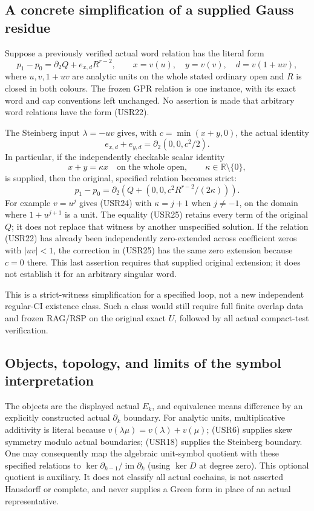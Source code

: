 \subsection{A concrete simplification of a supplied Gauss residue}

Suppose a previously verified actual word relation has the literal
form
\[
 p_1-p_0=\partial_2Q+e_{x,d}R^{r-2},\qquad
 x=v(u),\quad y=v(v),\quad d=v(1+uv),
 \tag{USR22}
\]
where $u,v,1+uv$ are analytic units on the whole stated ordinary
open and $R$ is closed in both colours.  The frozen GPR relation
is one instance, with its exact word and cap conventions left
unchanged.  No assertion is made that arbitrary word relations
have the form (USR22).

The Steinberg input $\lambda=-uv$ gives, with
$c=\min(x+y,0)$, the actual identity
\[
                   e_{x,d}+e_{y,d}
                        =\partial_2(0,0,c^2/2).
 \tag{USR23}
\]
In particular, if the independently checkable scalar identity
\[
                             x+y=\kappa x
                 \quad\text{on the whole open},\qquad
                             \kappa\in\mathbb R\setminus\{0\},
 \tag{USR24}
\]
is supplied, then the original, specified relation becomes strict:
\[
 p_1-p_0=\partial_2\left(
       Q+(0,0,c^2R^{r-2}/(2\kappa))\right).
 \tag{USR25}
\]
For example $v=u^j$ gives (USR24) with $\kappa=j+1$ when
$j\ne-1$, on the domain where $1+u^{j+1}$ is a unit.
The equality (USR25) retains every term of the original $Q$;
it does not replace that witness by another unspecified solution.
If the relation (USR22) has already been independently zero-extended
across coefficient zeros with $|uv|<1$, the correction in (USR25)
has the same zero extension because $c=0$ there.  This last assertion
requires that supplied original extension; it does not establish it
for an arbitrary singular word.

This is a strict-witness simplification for a specified loop, not a
new independent regular-CI existence class.  Such a class would
still require full finite overlap data and frozen RAG/RSP on the
original exact $U$, followed by all actual compact-test verification.

\subsection{Objects, topology, and limits of the symbol interpretation}

The objects are the displayed actual $E_k$, and equivalence means
difference by an explicitly constructed actual $\partial_k$ boundary.
For analytic units, multiplicative additivity is literal because
$v(\lambda\mu)=v(\lambda)+v(\mu)$; (USR6) supplies skew symmetry
modulo actual boundaries; (USR18) supplies the Steinberg boundary.
One may consequently map the algebraic unit-symbol quotient with
these specified relations to
$\ker\partial_{k-1}/\operatorname{im}\partial_k$ (using $\ker D$
at degree zero).  This optional quotient is auxiliary.  It does
not classify all actual cochains, is not asserted Hausdorff or
complete, and never supplies a Green form in place of an actual
representative.

